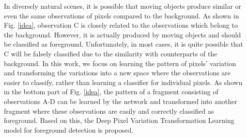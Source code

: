 \documentclass[journal]{IEEEtran}
\newcommand{\reffig}[1]{Fig. \ref{#1}}
\begin{document}
In diversely natural scenes,
it is possible that moving objects produce similar or even the same observations of pixels compared to the background.
As shown in \reffig{idea},
observation C is closely related to the observations which belong to the background. However, it is actually produced by moving objects and should be classified as foreground.
Unfortunately, in most cases, it is quite possible that C will be falsely classified due to the similarity with counterparts of the background.
In this work, we focus on learning the pattern of pixels' variation and transforming the variations into a new space where the observations are easier to classify, rather than learning a classifier for individual pixels.
As shown in the bottom part of \reffig{idea}, the pattern of a fragment consisting of observations A-D can be learned by the network and transformed into another fragment where these observations are easily and correctly classified as foreground.
Based on this, the Deep Pixel Variation Transformation Learning model for foreground detection is proposed.
\end{document}
